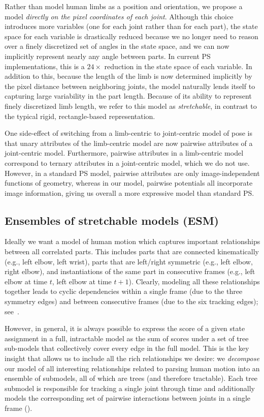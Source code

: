  Rather than model human limbs as a position 
and orientation, we propose a model {\em directly on the pixel coordinates of 
each joint}.  Although this choice introduces more variables 
(one for each joint rather than for each part), the state space for each 
variable is drastically reduced because we no longer need to reason over a 
finely discretized set of angles in the state space, and we can now implicitly 
represent nearly any angle between parts.  In current PS implementations, this is a 
$24\times$ reduction in the state space of each variable.  In addition to 
this, because the length of the limb is now determined implicitly by the pixel 
distance between neighboring joints, the model naturally lends itself to 
capturing large variability in the part length.  Because of its ability to 
represent finely discretized limb length, we refer to this model as
{\em stretchable}, in contrast to the typical rigid, rectangle-based 
representation.

One side-effect of switching from a limb-centric to joint-centric model of 
pose is that unary attributes of the limb-centric model are now pairwise 
attributes of a joint-centric model.  Furthermore, pairwise attributes in a 
limb-centric model correspond to ternary attributes in a joint-centric model, 
which we do not use.  However, in a standard PS model, pairwise attributes are 
only image-independent functions of geometry, whereas in our model, pairwise 
potentials all incorporate image information, giving us overall a more 
expressive model than standard PS. 



\subsection{Ensembles of stretchable models (ESM)}
Ideally we want a model of human motion which captures important
relationships between all correlated parts.  This includes parts that
are connected kinematically (e.g., left elbow, left wrist), parts that
are left/right symmetric (e.g., left elbow, right elbow), and
instantiations of the same part in consecutive frames (e.g., left
elbow at time $t$, left elbow at time $t+1$).  Clearly, modeling all
these relationships together leads to cyclic dependencies
within a single frame (due to the three symmetry edges) and
between consecutive frames (due to the six tracking edges); 
see~. 

However, in general, it is always possible to express the score of a
given state assignment in a full, intractable model as the sum of
scores under a set of tree sub-models that collectively cover every
edge in the full model. This is the key insight that allows us to
include all the rich relationships we desire: we {\em decompose} our
model of all interesting relationships related to parsing human motion
into an ensemble of submodels, all of which are trees (and therefore
tractable). Each tree submodel is responsible for tracking a single
joint through time and additionally models the corresponding set of
pairwise interactions between joints in a single frame
().

